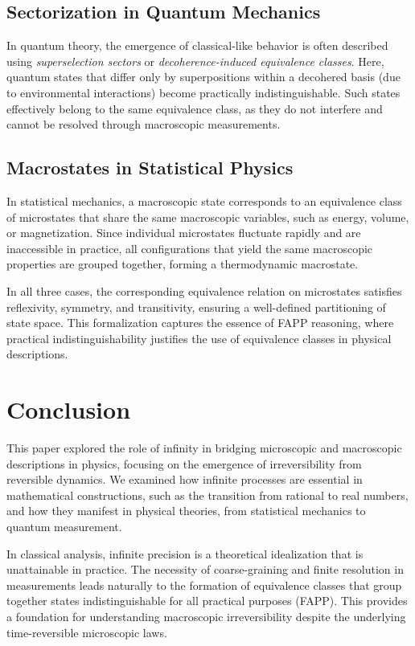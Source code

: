 \documentclass[shortAfour,sageh,times]{sagej}
\begin{document}
\subsection{Sectorization in Quantum Mechanics}
In quantum theory, the emergence of classical-like behavior is often described using \textit{superselection sectors} or \textit{decoherence-induced equivalence classes}. Here, quantum states that differ only by superpositions within a decohered basis (due to environmental interactions) become practically indistinguishable. Such states effectively belong to the same equivalence class, as they do not interfere and cannot be resolved through macroscopic measurements.

\subsection{Macrostates in Statistical Physics}
In statistical mechanics, a macroscopic state corresponds to an equivalence class of microstates that share the same macroscopic variables, such as energy, volume, or magnetization. Since individual microstates fluctuate rapidly and are inaccessible in practice, all configurations that yield the same macroscopic properties are grouped together, forming a thermodynamic macrostate.

In all three cases, the corresponding equivalence relation on microstates satisfies reflexivity, symmetry, and transitivity, ensuring a well-defined partitioning of state space. This formalization captures the essence of FAPP reasoning, where practical indistinguishability justifies the use of equivalence classes in physical descriptions.


\section{Conclusion}

This paper explored the role of infinity in bridging microscopic and macroscopic descriptions in physics, focusing on the emergence of irreversibility from reversible dynamics. We examined how infinite processes are essential in mathematical constructions, such as the transition from rational to real numbers, and how they manifest in physical theories, from statistical mechanics to quantum measurement.

In classical analysis, infinite precision is a theoretical idealization that is unattainable in practice. The necessity of coarse-graining and finite resolution in measurements leads naturally to the formation of equivalence classes that group together states indistinguishable for all practical purposes (FAPP). This provides a foundation for understanding macroscopic irreversibility despite the underlying time-reversible microscopic laws.
\end{document}
